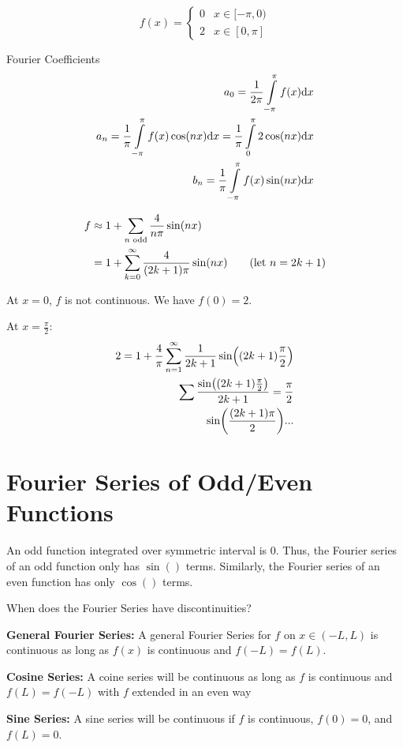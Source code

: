 \begin{example}
	\[ f(x) = \begin{cases}
		0 & x\in [-\pi, 0) \\
		2 & x\in [ 0, \pi]
	\end{cases}\]

	Fourier Coefficients
	\begin{align*}
		a_0 = \frac{1}{2\pi} \int\limits_{-\pi}^\pi f(x) \text{d} x\\
		a_n = \frac{1}{\pi} \int\limits_{-\pi}^\pi f(x) \cos (nx) \text{d} x = \frac{1}{\pi} \int\limits_0^\pi 2 \cos(nx) \text{d} x \\
		b_n = \frac{1}{\pi} \int\limits_{-\pi}^\pi f(x) \sin(nx) \text{d} x
	\end{align*}

	\begin{align*}
		f &\approx 1 + \sum\limits_{\text{$n$ odd}} \frac{4}{n\pi} \sin(nx) \\
		&= 1 + \sum\limits_{k=0}^\infty \frac{4}{(2k+1)\pi} \sin(n x) \tag{let $n = 2k+1$}
	\end{align*}

	At $x=0$, $f$ is not continuous. We have $f(0) = 2$. 
	
	At $x = \frac{\pi}{2}$:
	\begin{align*}
	2 = 1 + \frac{4}{\pi} \sum\limits_{n=1}^\infty \frac{1}{2k+1} \sin((2k+1)\frac{\pi}{2}) \\
		\sum\limits \frac{\sin((2k+1)\frac{\pi}{2})}{2k+1} = \frac{\pi}{2} \\ 
		\sin(\frac{(2k+1)\pi}{2}) ...
	\end{align*}
\end{example}

\section{Fourier Series of Odd/Even Functions}

An odd function integrated over symmetric interval is 0. Thus, the Fourier series of an odd function only has $\sin()$ terms. Similarly, the Fourier series of an even function has only $\cos()$ terms. 

\begin{quest}
	\item When does the Fourier Series have discontinuities?
	\begin{ans}
		\textbf{General Fourier Series:} A general Fourier Series for $f$ on $x\in (-L, L)$ is continuous as long as $f(x)$ is continuous and $f(-L) = f(L)$.
		
		\textbf{Cosine Series:} A coine series will be continuous as long as $f$ is continuous and $f(L) = f(-L)$ with $f$ extended in an even way

		\textbf{Sine Series:} A sine series will be continuous if $f$ is continuous, $f(0)=0$, and $f(L) = 0$. 
	\end{ans}
\end{quest}

